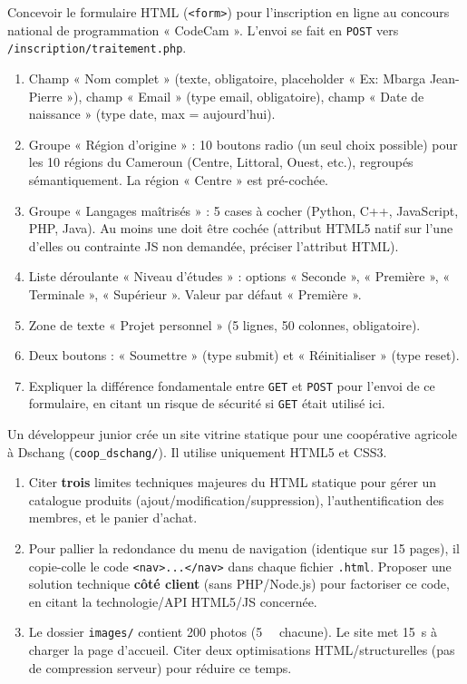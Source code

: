 \documentclass[11pt]{article}
\begin{document}
\begin{exercice}
Concevoir le formulaire HTML (\texttt{<form>}) pour l'inscription en ligne au concours national de programmation « CodeCam ». L'envoi se fait en \texttt{POST} vers \texttt{/inscription/traitement.php}.
\begin{enumerate}
    \item Champ « Nom complet » (texte, obligatoire, placeholder « Ex: Mbarga Jean-Pierre »), champ « Email » (type email, obligatoire), champ « Date de naissance » (type date, max = aujourd'hui).
    \item Groupe « Région d'origine » : 10 boutons radio (un seul choix possible) pour les 10 régions du Cameroun (Centre, Littoral, Ouest, etc.), regroupés sémantiquement. La région « Centre » est pré-cochée.
    \item Groupe « Langages maîtrisés » : 5 cases à cocher (Python, C++, JavaScript, PHP, Java). Au moins une doit être cochée (attribut HTML5 natif sur l'une d'elles ou contrainte JS non demandée, préciser l'attribut HTML).
    \item Liste déroulante « Niveau d'études » : options « Seconde », « Première », « Terminale », « Supérieur ». Valeur par défaut « Première ».
    \item Zone de texte « Projet personnel » (5 lignes, 50 colonnes, obligatoire).
    \item Deux boutons : « Soumettre » (type submit) et « Réinitialiser » (type reset).
    \item Expliquer la différence fondamentale entre \texttt{GET} et \texttt{POST} pour l'envoi de ce formulaire, en citant un risque de sécurité si \texttt{GET} était utilisé ici.
\end{enumerate}
\end{exercice}

\begin{exercice}
Un développeur junior crée un site vitrine statique pour une coopérative agricole à Dschang (\texttt{coop\_dschang/}). Il utilise uniquement HTML5 et CSS3.
\begin{enumerate}
    \item Citer \textbf{trois} limites techniques majeures du HTML statique pour gérer un catalogue produits (ajout/modification/suppression), l'authentification des membres, et le panier d'achat.
    \item Pour pallier la redondance du menu de navigation (identique sur 15 pages), il copie-colle le code \texttt{<nav>...</nav>} dans chaque fichier \texttt{.html}. Proposer une solution technique \textbf{côté client} (sans PHP/Node.js) pour factoriser ce code, en citant la technologie/API HTML5/JS concernée.
    \item Le dossier \texttt{images/} contient 200 photos (\SI{5}{\mega\byte} chacune). Le site met \SI{15}{\second} à charger la page d'accueil. Citer deux optimisations HTML/structurelles (pas de compression serveur) pour réduire ce temps.
\end{enumerate}
\end{exercice}
\end{document}
